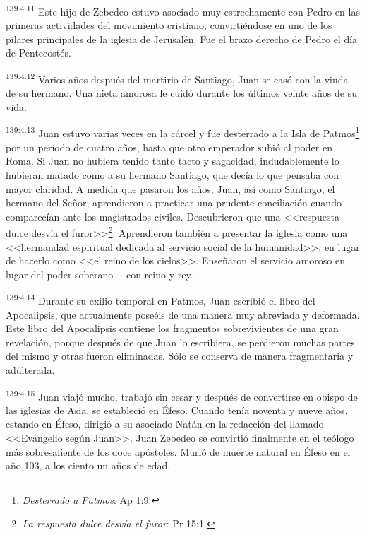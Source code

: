 \par 
\textsuperscript{139:4.11} Este hijo de Zebedeo estuvo asociado muy estrechamente con Pedro en las primeras actividades del movimiento cristiano, convirtiéndose en uno de los pilares principales de la iglesia de Jerusalén. Fue el brazo derecho de Pedro el día de Pentecostés.

\par 
\textsuperscript{139:4.12} Varios años después del martirio de Santiago, Juan se casó con la viuda de su hermano. Una nieta amorosa le cuidó durante los últimos veinte años de su vida.

\par 
\textsuperscript{139:4.13} Juan estuvo varias veces en la cárcel y fue desterrado a la Isla de Patmos\footnote{\textit{Desterrado a Patmos}: Ap 1:9.} por un período de cuatro años, hasta que otro emperador subió al poder en Roma. Si Juan no hubiera tenido tanto tacto y sagacidad, indudablemente lo hubieran matado como a su hermano Santiago, que decía lo que pensaba con mayor claridad. A medida que pasaron los años, Juan, así como Santiago, el hermano del Señor, aprendieron a practicar una prudente conciliación cuando comparecían ante los magistrados civiles. Descubrieron que una <<respuesta dulce desvía el furor>>\footnote{\textit{La respuesta dulce desvía el furor}: Pr 15:1.}. Aprendieron también a presentar la iglesia como una <<hermandad espiritual dedicada al servicio social de la humanidad>>, en lugar de hacerlo como <<el reino de los cielos>>. Enseñaron el servicio amoroso en lugar del poder soberano ---con reino y rey.

\par 
\textsuperscript{139:4.14} Durante su exilio temporal en Patmos, Juan escribió el libro del Apocalipsis, que actualmente poseéis de una manera muy abreviada y deformada. Este libro del Apocalipsis contiene los fragmentos sobrevivientes de una gran revelación, porque después de que Juan lo escribiera, se perdieron muchas partes del mismo y otras fueron eliminadas. Sólo se conserva de manera fragmentaria y adulterada.

\par 
\textsuperscript{139:4.15} Juan viajó mucho, trabajó sin cesar y después de convertirse en obispo de las iglesias de Asia, se estableció en Éfeso. Cuando tenía noventa y nueve años, estando en Éfeso, dirigió a su asociado Natán en la redacción del llamado <<Evangelio según Juan>>. Juan Zebedeo se convirtió finalmente en el teólogo más sobresaliente de los doce apóstoles. Murió de muerte natural en Éfeso en el año 103, a los ciento un años de edad.

